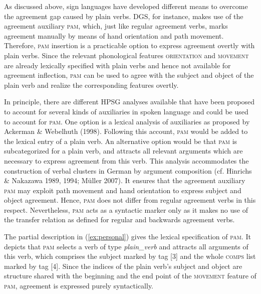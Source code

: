 \documentclass[11pt,a4paper,fleqn]{article}
\begin{document}
As discussed above, sign languages have developed different means to overcome the agreement gap caused by plain verbs. DGS, for instance, makes use of the agreement auxiliary \textsc{pam}, which, just like regular agreement verbs, marks agreement manually by means of hand orientation and path movement. Therefore, \textsc{pam} insertion is a practicable option to express agreement overtly with plain verbs. Since the relevant phonological features \textsc{orientation} and \textsc{movement} are already lexically specified with plain verbs and hence not available for agreement inflection, \textsc{pam} can be used to agree with the subject and object of the plain verb and realize the corresponding features overtly.

In principle, there are different HPSG analyses available that have been proposed to account for several kinds of auxiliaries in spoken language and could be used to account for \textsc{pam}. One option is a lexical analysis of auxiliaries as proposed by Ackerman \& Webelhuth (1998). Following this account, \textsc{pam} would be added to the lexical entry of a plain verb. An alternative option would be that \textsc{pam} is subcategorized for a plain verb, and attracts all relevant arguments which are necessary to express agreement from this verb. This analysis accommodates the construction of verbal clusters in German by argument composition (cf. Hinrichs \& Nakazawa 1989, 1994; Müller 2007). It ensures that the agreement auxiliary \textsc{pam} may exploit path movement and hand orientation to express subject and object agreement. Hence, \textsc{pam} does not differ from regular agreement verbs in this respect. Nevertheless, \textsc{pam} acts as a syntactic marker only as it makes no use of the transfer relation as defined for regular and backwards agreement verbs.

 

The partial description in (\ref{ex:personal}) gives the lexical specification of \textsc{pam}. It depicts that \textsc{pam} selects a verb of type \textit{plain\_verb} and attracts all arguments of this verb, which comprises the subject marked by tag [3] and the whole \textsc{comps} list marked by tag [4]. Since the indices of the plain verb's subject and object are structure shared with the beginning and the end point of the \textsc{movement} feature of \textsc{pam}, agreement is expressed purely syntactically. 
\end{document}
